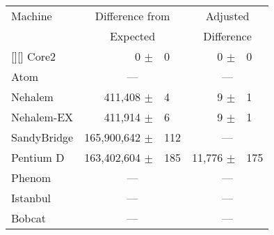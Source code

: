\begin{tabular}{|l||rl|rl|}

\hline

Machine   & \multicolumn{2}{c|}{Difference from} & \multicolumn{2}{c|}{Adjusted} \\
          & \multicolumn{2}{c|}{Expected}        & \multicolumn{2}{c|}{Difference} \\

\hline
\hline
\rowcolor{yellow}[\tabcolsep][\tabcolsep]
Core2          &    0 $\pm$ &0                  &        0 $\pm$ &0 \\
\hline
Atom           & \multicolumn{2}{c|}{---}  &  \multicolumn{2}{c|}{---} \\
\hline
Nehalem        & 411,408 $\pm$ &4               &    9 $\pm$ &1 \\
\hline
Nehalem-EX     & 411,914 $\pm$ &6               &    9 $\pm$ &1 \\
\hline
SandyBridge    & 165,900,642 $\pm$ &112         &   \multicolumn{2}{c|}{---} \\
\hline
Pentium D      & 163,402,604 $\pm$ & 185         &  11,776  $\pm$ &175     \\
\hline
Phenom         &  \multicolumn{2}{c|}{---} &  \multicolumn{2}{c|}{---} \\
\hline
Istanbul       &  \multicolumn{2}{c|}{---} &  \multicolumn{2}{c|}{---} \\
\hline
Bobcat       &  \multicolumn{2}{c|}{---} &  \multicolumn{2}{c|}{---} \\
\hline
\end{tabular}

